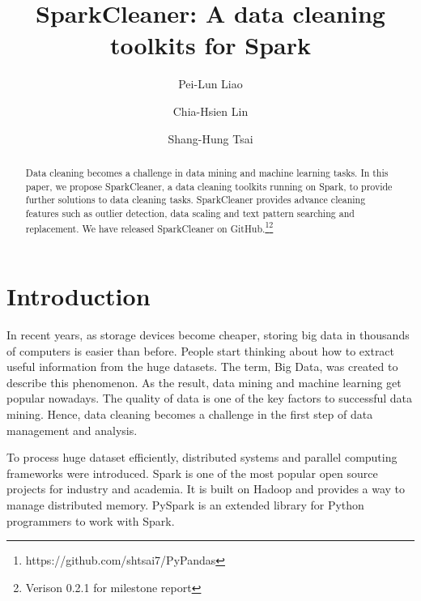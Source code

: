 \documentclass[sigconf]{acmart}
\begin{document}
\title{SparkCleaner: A data cleaning toolkits for Spark}

\author{Pei-Lun Liao}

\author{Chia-Hsien Lin}

\author{Shang-Hung Tsai}

\begin{abstract}
Data cleaning becomes a challenge in data mining and machine learning tasks. In this paper, we propose SparkCleaner, a data cleaning toolkits running on Spark, to provide further solutions to data cleaning tasks. SparkCleaner provides advance cleaning features such as outlier detection, data scaling and text pattern searching and replacement. We have released SparkCleaner on GitHub.\footnote{https://github.com/shtsai7/PyPandas}\footnote{Verison 0.2.1 for milestone report}
\end{abstract}

\maketitle

\section{Introduction}
In recent years, as storage devices become cheaper, storing big data in thousands of computers is easier than before. People start thinking about how to extract useful information from the huge datasets. The term, Big Data, was created to describe this phenomenon\cite{bigdata}. As the result, data mining\cite{Han, MMD} and machine learning\cite{ml} get popular nowadays. The quality of data is one of the key factors to successful data mining\cite{dataquality}. Hence, data cleaning becomes a challenge in the first step of data management and analysis\cite{datacleaning, DBS-045, PW}.
	
To process huge dataset efficiently, distributed systems and parallel computing frameworks\cite{mapreduce, gfs, hadoop} were introduced. Spark\cite{spark} is one of the most popular open source projects for industry and academia. It is built on Hadoop\cite{hadoop} and provides a way to manage distributed memory. PySpark\cite{pyspark} is an extended library for Python programmers to work with Spark.
	
\end{document}
